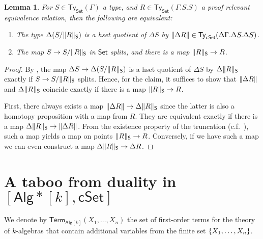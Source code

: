 \documentclass[10pt,a4paper]{article}
\newtheorem{lemma}[theorem]{Lemma}
\theoremstyle{definition}
\theoremstyle{remark}
\newcommand{\Set}{\mathsf{Set}}
\newcommand{\cSet}{\mathsf{cSet}}
\newcommand{\Alg}{\mathsf{Alg}}
\newcommand\Ty{\mathsf{Ty}}
\DeclarePairedDelimiter\set{\{}{\}}
\newcommand\Term{\mathsf{Term}}
\begin{document}
\begin{lemma}\label{prop:set-relevant-quotient-is-hset-quotient-iff-surjection-splits-and-witnesses-exist}
  For \(S \in \Ty_{\Set}(\Gamma)\) a type, and \(R \in \Ty_{\Set}(\Gamma.S.S)\) a proof relevant equivalence relation, then the following are equivalent:
  \begin{enumerate}[label=(\arabic*)]
    \item The type \(\Delta(S/\trunc*{R})\) is a hset quotient of \(\Delta S\) by \(\trunc{\Delta R} \in \Ty_{\cSet}(\Delta\Gamma.\Delta S. \Delta S)\).
    \item The map \(S \to S/\trunc*{R}\) in \(\Set\) splits, and there is a map \(\trunc*{R} \to R\).
  \end{enumerate}
\end{lemma}
\begin{proof}
  By , the map \(\Delta S \to \Delta(S/\trunc*{R})\) is a hset quotient of \(\Delta S\) by \(\Delta\trunc*{R}\) exactly if \(S \to S/\trunc*{R}\) splits.
  Hence, for the claim, it suffices to show that \(\trunc{\Delta R}\) and \(\Delta\trunc*{R}\) coincide exactly if there is a map \(\trunc*{R} \to R\).
  
  First, there always exists a map \(\trunc{\Delta R} \to \Delta\trunc*{R}\) since the latter is also a homotopy proposition with a map from \(R\).
  They are equivalent exactly if there is a map \(\Delta\trunc*{R} \to \trunc{\Delta R}\).
  From the existence property of the truncation (c.f.~\cite[Section~8.3]{draft}), such a map yields a map on points \(\trunc*{R} \to R\).
  Conversely, if we have such a map we can even construct a map \(\Delta\trunc*{R} \to \Delta R\).
\end{proof}


\section{A taboo from duality in \texorpdfstring{\([\Alg*[k], \cSet]\)}{[k-Algᶠᵖ, cSet]}}\label{sec:k-duality-implies-k-alg-choice}

We denote by \(\Term_{\Alg[k]}(X_1, \ldots, X_n)\) the set of first-order terms for the theory of \(k\)-algebras that contain additional variables from the finite set \(\set{X_1, \ldots, X_n}\).
\end{document}
